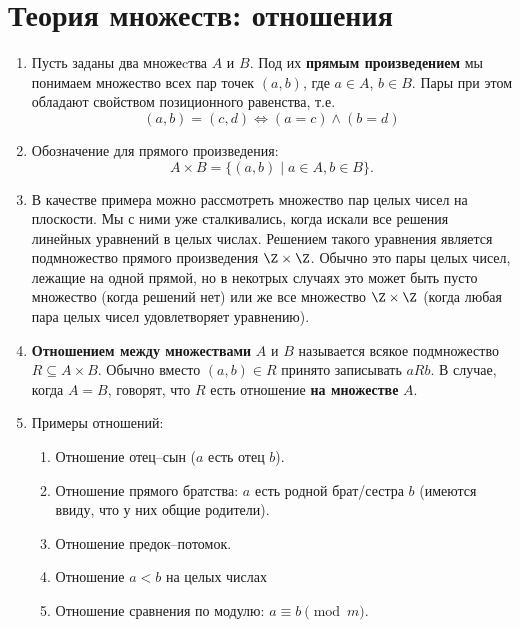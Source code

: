 \section{Теория множеств: отношения}\label{Rels}




\begin{enumerate}
\item Пусть заданы два множеcтва $A$ и $B$. Под их \textbf{прямым произведением} мы понимаем множество всех пар точек $(a,b)$, где $a\in A$, $b\in B$. Пары при этом обладают свойством позиционного равенства, т.е.
\begin{equation}\label{pairdiff}
(a,b)=(c,d) \iff (a=c)\land (b=d)
\end{equation}

\item Обозначение для прямого произведения:
$$
A\times B = \{(a,b)\mid a\in A, b\in B\}.
$$
\item В качестве примера можно рассмотреть множество пар целых чисел на плоскости. Мы с ними уже сталкивались, когда искали все решения линейных уравнений в целых числах. Решением такого уравнения является подмножество прямого произведения $\Z\times\Z$. Обычно это пары целых чисел, лежащие на одной прямой, но в некотрых случаях это может быть пусто множество (когда решений нет) или же все множество $\Z\times\Z$ (когда любая пара целых чисел удовлетворяет уравнению).
\item \textbf{Отношением между множествами} $A$ и $B$ называется всякое подмножество $R\subseteq A\times B$. Обычно вместо $(a,b)\in R$ принято записывать $aRb$. В случае, когда $A=B$, говорят, что $R$ есть отношение \textbf{на множестве} $A$.
\item Примеры отношений:
\begin{enumerate}[\bf R1]
\item Отношение отец--сын ($a$ есть отец $b$).
\item Отношение прямого братства: $a$ есть родной брат/сестра $b$ (имеются ввиду, что у них общие родители).
\item Отношение предок--потомок.
\item Отношение $a<b$ на целых числах
\item Отношение сравнения по модулю: $a\equiv b\pmod m$.
\end{enumerate}


\end{enumerate}
